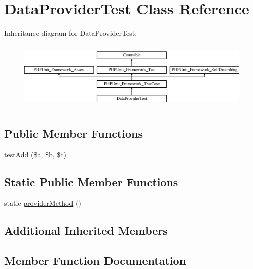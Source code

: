 \hypertarget{class_data_provider_test}{}\section{Data\+Provider\+Test Class Reference}
\label{class_data_provider_test}
Inheritance diagram for Data\+Provider\+Test\+:\begin{figure}[H]
\begin{center}
\leavevmode
\includegraphics[height=3.303835cm]{class_data_provider_test}
\end{center}
\end{figure}
\subsection*{Public Member Functions}
\begin{DoxyCompactItemize}
\item 
\mbox{\hyperlink{class_data_provider_test_aee936425adb92ab632ef751353789f64}{test\+Add}} (\$\mbox{\hyperlink{interfacea}{a}}, \$\mbox{\hyperlink{interfaceb}{b}}, \$\mbox{\hyperlink{classc}{c}})
\end{DoxyCompactItemize}
\subsection*{Static Public Member Functions}
\begin{DoxyCompactItemize}
\item 
static \mbox{\hyperlink{class_data_provider_test_aa41ff734aa7d002dc2a7a32a9e35b499}{provider\+Method}} ()
\end{DoxyCompactItemize}
\subsection*{Additional Inherited Members}


\subsection{Member Function Documentation}
\mbox{\label{class_data_provider_test_aa41ff734aa7d002dc2a7a32a9e35b499}} 

